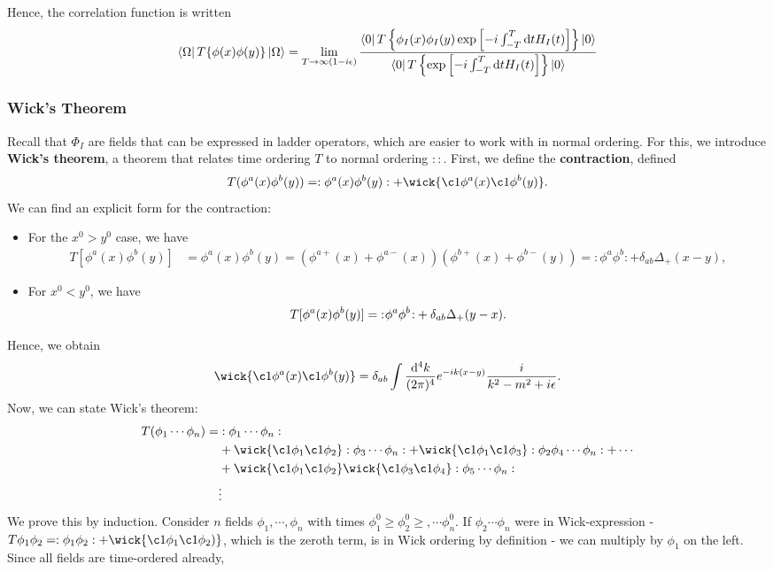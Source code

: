 \documentclass{article}
\begin{document}
Hence, the correlation function is written 
\begin{equation}
    \bra\Omega T\{\phi(x)\phi(y)\}\ket\Omega=\lim_{T\to\infty(1-i\epsilon)}\frac{\bra 0T\left\{\phi_I(x)\phi_I(y)\exp\left[-i\int^T_{-T}\dd t H_I(t)\right]\right\}\ket 0}{\bra 0T\left\{\exp\left[-i\int^T_{-T}\dd tH_I(t)\right]\right\}\ket 0}
\end{equation}

\subsubsection{Wick's Theorem}

Recall that $\Phi_I$ are fields that can be expressed in ladder operators, which are easier to work with in normal ordering. For this, we introduce \textbf{Wick's theorem}, a theorem that relates time ordering $T$ to normal ordering $::$. First, we define the \textbf{contraction}, defined 
$$T(\phi^a(x)\phi^b(y))=:\phi^a(x)\phi^b(y):+\wick{\c1\phi^a(x)\c1\phi^b(y)}.$$
We can find an explicit form for the contraction:
\begin{itemize}
    \item For the $x^0>y^0$ case, we have 
    \begin{align*}
        T[\phi^a(x)\phi^b(y)]&=\phi^a(x)\phi^b(y)=\left(\phi^{a+}(x)+\phi^{a-}(x)\right)\left(\phi^{b+}(x)+\phi^{b-}(y)\right)=:\phi^a\phi^b:+\delta_{ab}\Delta_+(x-y),
    \end{align*}
    \item For $x^0<y^0$, we have 
    $$T[\phi^a(x)\phi^b(y)]={:}\mkern1mu\phi^a\phi^b\mkern1.6mu{:}+\delta_{ab}\Delta_+(y-x).$$
\end{itemize}
Hence, we obtain
$$\wick{\c1\phi^a(x)\c1\phi^b(y)}=\delta_{ab}\int\frac{\dd^4k}{(2\pi)^4}e^{-ik(x-y)}\frac{i}{k^2-m^2+i\epsilon}.$$
Now, we can state Wick's theorem:
\begin{align}
\begin{split}
    T(\phi_1\cdots\phi_n)=&:\phi_1\cdots\phi_n:\\
    &+\wick{\c1\phi_1\c1\phi_2}:\phi_3\cdots\phi_n:+\wick{\c1\phi_1\c1\phi_3}:\phi_2\phi_4\cdots\phi_n:+\cdots\\
    &+\wick{\c1\phi_1\c1\phi_2}\wick{\c1\phi_3\c1\phi_4}:\phi_5\cdots\phi_n:\\
    &\vdots
\end{split}
\end{align}
We prove this by induction. Consider $n$ fields $\phi_1,\cdots,\phi_n$ with times $\phi_1^0\ge \phi_2^0\ge,\cdots\phi_n^0$. If $\phi_2\cdots\phi_n$ were in Wick-expression - $T\phi_1\phi_2=:\phi_1\phi_2:+\wick{\c1\phi_1\c1\phi_2)}$, which is the zeroth term, is in Wick ordering by definition - we can multiply by $\phi_1$ on the left. Since all fields are time-ordered already,
\end{document}
